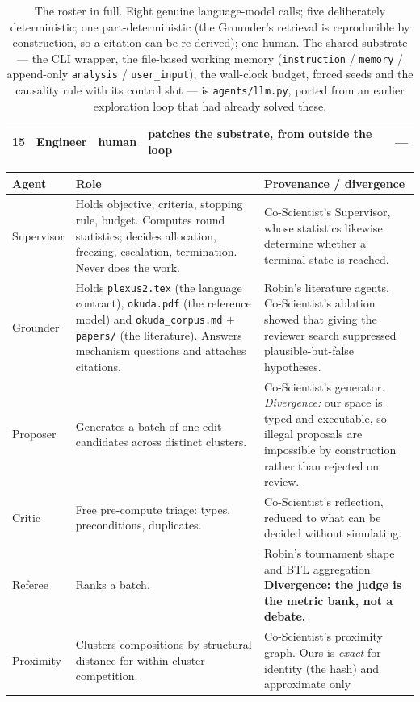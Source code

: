 \documentclass[11pt]{article}
\newcommand{\code}[1]{\texttt{#1}}
\begin{document}
\begin{table}[t]
\begin{tabular}{@{}rlcp{5.6cm}p{4.4cm}@{}}
15 & Engineer & human & patches the substrate, from outside the loop & --- \\
\bottomrule
\end{tabular}
\caption{The roster in full. Eight genuine language-model calls; five deliberately deterministic;
one part-deterministic (the Grounder's retrieval is reproducible by construction, so a citation
can be re-derived); one human. The shared substrate --- the CLI wrapper, the file-based working
memory (\code{instruction} / \code{memory} / append-only \code{analysis} / \code{user\_input}),
the wall-clock budget, forced seeds and the causality rule with its control slot --- is
\code{agents/llm.py}, ported from an earlier exploration loop that had already solved these.}
\label{tab:agents}
\end{table}


\begin{center}\small
\begin{tabular}{@{}p{2.2cm}p{6.5cm}p{5.6cm}@{}}
\toprule
\textbf{Agent} & \textbf{Role} & \textbf{Provenance / divergence} \\
\midrule
Supervisor & Holds objective, criteria, stopping rule, budget. Computes round statistics; decides
allocation, freezing, escalation, termination. Never does the work. & Co-Scientist's Supervisor,
whose statistics likewise determine whether a terminal state is reached. \\
Grounder & Holds \code{plexus2.tex} (the language contract), \code{okuda.pdf} (the reference
model) and \code{okuda\_corpus.md} $+$ \code{papers/} (the literature). Answers mechanism
questions and attaches citations. & Robin's literature agents. Co-Scientist's ablation showed
that giving the reviewer search suppressed plausible-but-false hypotheses. \\
Proposer & Generates a batch of one-edit candidates across distinct clusters. & Co-Scientist's
generator. \emph{Divergence:} our space is typed and executable, so illegal proposals are
impossible by construction rather than rejected on review. \\
Critic & Free pre-compute triage: types, preconditions, duplicates. & Co-Scientist's reflection,
reduced to what can be decided without simulating. \\
Referee & Ranks a batch. & Robin's tournament shape and BTL aggregation. \textbf{Divergence: the
judge is the metric bank, not a debate.} \\
Proximity & Clusters compositions by structural distance for within-cluster competition. &
Co-Scientist's proximity graph. Ours is \emph{exact} for identity (the hash) and approximate only

\end{tabular}
\end{center}
\end{document}
